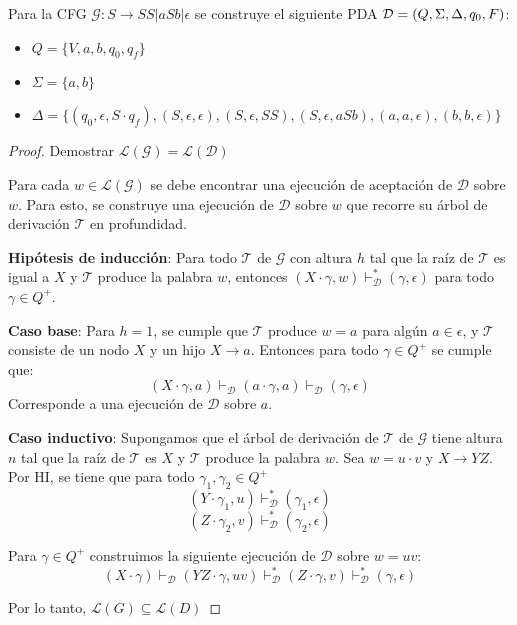 \documentclass[a4paper,twoside,master.tex]{article}
\begin{document}
\begin{ej}
    Para la CFG $\mathcal{G}: S \to SS | aSb | \epsilon$ se construye el siguiente PDA $\mathcal{D} = (Q, \Sigma, \Delta, q_0, F)$:
    \begin{itemize}
        \item $Q = \{ V, a, b, q_0, q_f \}$
        \item $\Sigma = \{ a, b \}$
        \item $\Delta = \{ (q_0, \epsilon, S \cdot q_f), (S, \epsilon, \epsilon), (S, \epsilon, SS), (S, \epsilon, aSb), (a, a, \epsilon), (b, b, \epsilon) \}$
    \end{itemize}
\end{ej}

\begin{proof}
    Demostrar $\mathcal{L}(\mathcal{G}) = \mathcal{L}(\mathcal{D})$

    Para cada $w \in \mathcal{L}(\mathcal{G})$ se debe encontrar una ejecución de aceptación de $\mathcal{D}$ sobre $w$. Para esto, se construye una ejecución de $\mathcal{D}$ sobre $w$ que recorre su árbol de derivación $\mathcal{T}$ en profundidad.

    \textbf{Hipótesis de inducción}: Para todo $\mathcal{T}$ de $\mathcal{G}$ con altura $h$ tal que la raíz de $\mathcal{T}$ es igual a $X$ y $\mathcal{T}$ produce la palabra $w$, entonces $(X \cdot \gamma, w) \vdash^*_{\mathcal{D}} (\gamma, \epsilon)$ para todo $\gamma \in Q^+$.

    \textbf{Caso base}: Para $h = 1$, se cumple que $\mathcal{T}$ produce $w = a$ para algún $a \in \epsilon$, y $\mathcal{T}$ consiste de un nodo $X$ y un hijo $X \to a$. Entonces para todo $\gamma \in Q^+$ se cumple que:
    $$(X \cdot \gamma, a) \vdash_\mathcal{D} (a \cdot \gamma, a) \vdash_\mathcal{D} (\gamma, \epsilon)$$
    Corresponde a una ejecución de $\mathcal{D}$ sobre $a$.

    \textbf{Caso inductivo}: Supongamos que el árbol de derivación de $\mathcal{T}$ de $\mathcal{G}$ tiene altura $n$ tal que la raíz de $\mathcal{T}$ es $X$ y $\mathcal{T}$ produce la palabra $w$. Sea $w = u \cdot v$ y $X \to YZ$. Por HI, se tiene que para todo $\gamma_1, \gamma_2 \in Q^+$
    $$(Y \cdot \gamma_1, u) \vdash^*_{\mathcal{D}} (\gamma_1, \epsilon)$$
    $$(Z \cdot \gamma_2, v) \vdash^*_{\mathcal{D}} (\gamma_2, \epsilon)$$

    Para $\gamma \in Q^+$ construimos la siguiente ejecución de $\mathcal{D}$ sobre $w = uv$:
    $$(X \cdot \gamma) \vdash_\mathcal{D} (YZ \cdot \gamma, uv) \vdash^*_{\mathcal{D}} (Z\cdot \gamma, v) \vdash^*_{\mathcal{D}} (\gamma, \epsilon)$$

    Por lo tanto, $\mathcal{L}(G) \subseteq \mathcal{L}(D)$


\end{proof}
\end{document}
